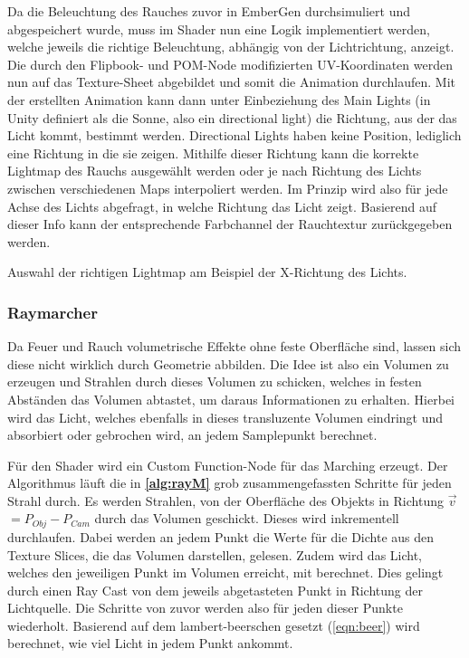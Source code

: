Da die Beleuchtung des Rauches zuvor in EmberGen durchsimuliert und abgespeichert wurde, muss im Shader nun eine Logik implementiert werden, welche jeweils die richtige Beleuchtung,
abhängig von der Lichtrichtung, anzeigt. Die durch den Flipbook- und POM-Node modifizierten UV-Koordinaten werden nun auf das Texture-Sheet abgebildet und somit die Animation durchlaufen.
Mit der erstellten Animation kann dann unter Einbeziehung des Main Lights (in Unity definiert als die Sonne, also ein directional light) die Richtung, aus der
das Licht kommt, bestimmt werden. Directional Lights haben keine Position, lediglich eine Richtung in die sie zeigen. Mithilfe dieser Richtung kann die korrekte Lightmap
des Rauchs ausgewählt werden oder je nach Richtung des Lichts zwischen verschiedenen Maps interpoliert werden. Im Prinzip wird also für jede Achse des Lichts abgefragt,
in welche Richtung das Licht zeigt. Basierend auf dieser Info kann der entsprechende Farbchannel der Rauchtextur zurückgegeben werden.


\begin{algorithm}
	\caption{Auswahl der richtigen Lightmap am Beispiel der X-Richtung des Lichts.}
	\label{alg:lightMapLogik}
	\begin{algorithmic}[1]

		\Else
		\EndIf
	\end{algorithmic}
\end{algorithm}

\subsubsection{Raymarcher}

Da Feuer und Rauch volumetrische Effekte ohne feste Oberfläche sind, lassen sich diese nicht wirklich durch Geometrie abbilden. Die Idee ist also ein
Volumen zu erzeugen und Strahlen durch dieses Volumen zu schicken, welches in festen Abständen das Volumen abtastet, um daraus Informationen zu erhalten.
Hierbei wird das Licht, welches ebenfalls in dieses transluzente Volumen eindringt und absorbiert oder gebrochen wird, an jedem Samplepunkt berechnet.

Für den Shader wird ein Custom Function-Node für das Marching erzeugt. Der Algorithmus läuft die in \textbf{\autoref{alg:rayM}} grob zusammengefassten
Schritte für jeden Strahl durch.
Es werden Strahlen, von der Oberfläche des Objekts in Richtung $\vec{v}$ $= P_{Obj} - P_{Cam} $ durch das Volumen geschickt.
Dieses wird inkrementell durchlaufen. Dabei werden an jedem Punkt die Werte für die Dichte aus den Texture Slices, die das Volumen darstellen, gelesen. Zudem
wird das Licht, welches den jeweiligen Punkt im Volumen erreicht, mit berechnet. Dies gelingt durch einen Ray Cast von
dem jeweils abgetasteten Punkt in Richtung der Lichtquelle. Die Schritte von zuvor werden also für jeden dieser Punkte wiederholt.
Basierend auf dem lambert-beerschen gesetzt (\autoref{eqn:beer}) wird berechnet, wie viel Licht in jedem Punkt ankommt.



